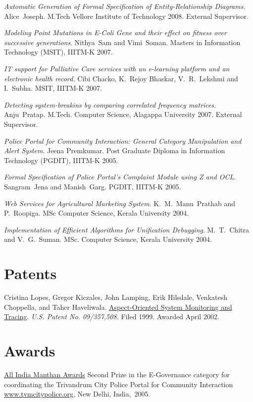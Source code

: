 \documentclass[11pt,margin,line]{res}
\begin{document}
\begin{resume}
{\em Automatic Generation of Formal Specification of
  Entity-Relationship Diagrams}.  Alice~Joseph.  M.Tech
Vellore Institute of Technology 2008.  External Supervisor.

{\em Modeling Point Mutations in E-Coli Gene and their
  effect on fitness over successive generations}.
Nithya~Sam and Vimi~Soman.  Masters in Information
Technology (MSIT), IIITM-K 2007.  

{\em IT support for Palliative Care services with an
  e-learning platform and an electronic health record.}
Cibi Chacko, K.~Rejoy Bhaskar, V.~R.~Lekshmi and I.~Subha.
MSIT, IIITM-K 2007.

{\em Detecting system-breakins by comparing correlated
  frequency matrices}.  Anju~Pratap.  M.Tech. Computer
Science, Alagappa University 2007.  External Supervisor.

{\em Police Portal for Community Interaction: General
  Category Manipulation and Alert System}.  Jeena Premkumar.
Post Graduate Diploma in Information Technology (PGDIT),
IIITM-K 2005.

{\em Formal Specification of Police Portal's Complaint
  Module using Z and OCL}.  Sangram~Jena and Manish~Garg.
PGDIT, IIITM-K 2005. 

{\emph{Web Services for Agricultural Marketing System}}.
K.~M.~Manu~Prathab and P.~Roopiga.  MSc Computer Science,
Kerala University 2004.

{\em Implementation of Efficient Algorithms for Unification
  Debugging}.  M.~T.~Chitra and V.~G.~Suman.  MSc. Computer
Science, Kerala University 2004.

\vspace{2em}

\section{\sc Patents}

Cristina Lopes, Gregor Kiczales, John Lamping, Erik Hilsdale,
Venkatesh Choppella, and Taher Haveliwala.
\href{http://www.patentstorm.us/patents/6473895.html}
{Aspect-Oriented System Monitoring and Tracing}.  {\em {U.S.
    Patent No. 09/357,508.}} Filed 1999. Awarded April 2002.

\section{\sc Awards}

\href{http://www.manthanaward.com/winner2005.asp}{All India
Manthan Awards} Second Prize in the E-Governance category
for coordinating the Trivandrum City Police Portal for
Community Interaction \url{www.tvmcitypolice.org}, New
Delhi, India,~2005.


\end{resume}
\end{document}
